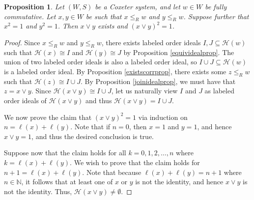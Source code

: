 \documentclass[10pt,a4paper]{amsart}
\newtheorem{prop}{Proposition}
\def\H#1{\mathcal{H}(#1)}
\def\N{\mathbb{N}}
\def\weakr{\leq_{R}}
\begin{document}
\begin{prop} \label{joinisinvolution}
    Let $ (W,S)$ be a Coxeter system, and let $ w\in W$ be fully commutative. Let $ x,y\in W$ be such that $ x \weakr w$ and $ y\weakr w$. Suppose further that $ x^{2} = 1$ and $ y^{2}=1$. Then $ x\vee y$ exists and $ (x \vee y)^{2}  =1$.
\end{prop}

\begin{proof}
    Since $ x \weakr w$ and $ y \weakr w$, there exists labeled order ideals $I, J \subseteq \H{w}$ such that $\H{x} \cong I $ and $ \H{y} \cong J$ by Proposition \ref{equividealprop}. The union of two labeled order ideals is also a labeled order ideal, so $I \cup J \subseteq \H{w}$ is a labeled order ideal. By Proposition \ref{existscorrprop}, there exists some $ z \weakr w$ such that $ \H{z} \cong I \cup J$. By Proposition \ref{joinidealprop}, we must have that $ z = x \vee y$. Since $ \H{x\vee y} \cong I \cup J$, let us naturally view $ I$ and $J$ as labeled order ideals of $ \H{x\vee y}$ and thus $ \H{x \vee y} = I \cup J$.

    We now prove the claim that $ (x\vee y)^{2} = 1$ via induction on $n= \ell(x) + \ell(y)$. Note that if $ n = 0$, then $ x=1$ and $ y=1$, and hence $ x\vee y = 1$, and thus the desired conclusion is true.

    Suppose now that the claim holds for all $ k =0,1,2,  \dots , n$ where $ k = \ell(x) + \ell(y)$. We wish to prove that the claim holds for $ n+1 = \ell(x) + \ell(y)$. Note that because $ \ell(x) + \ell(y) = n+1$ where $n\in \N$, it follows that at least one of $ x$ or $y$ is not the identity, and hence $ x\vee y$ is not the identity. Thus, $ \H{x \vee y} \neq \emptyset$. 
    

\end{proof}
\end{document}
